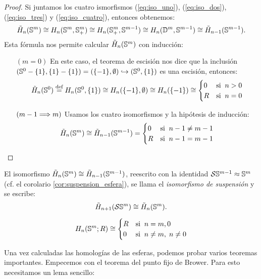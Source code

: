 \documentclass[../../topologia_algebraica]{subfiles}
\begin{document}
\begin{proof}
  Si juntamos los cuatro ismorfismos (\ref{eq:iso_uno}), (\ref{eq:iso_dos}), (\ref{eq:iso_tres})
  y (\ref{eq:iso_cuatro}), entonces obtenemos:
  \[
    \tilde{H}_n(\mathbb{S}^m)\cong
    H_n(\mathbb{S}^m,\mathbb{S}^m_+) \cong
    H_n(\mathbb{S}^m_+,\mathbb{S}^{m-1}) \cong
    H_n(\mathbb{D}^m,\mathbb{S}^{m-1}) \cong
    \tilde{H}_{n-1}(\mathbb{S}^{m-1}).
  \]
  Esta f\'ormula nos permite calcular $\tilde{H}_n(\mathbb{S}^m)$ con inducci\'on:
  \begin{enumerate}
  \item[$(m=0)$] En este caso, el teorema de escisi\'on nos dice que la inclusi\'on
    $(\mathbb{S}^0-\{1\},\{1\}-\{1\})=(\{-1\},\emptyset)\hookrightarrow(\mathbb{S}^0,\{1\})$ es
    una escisi\'on, entonces:
    \[
      \tilde{H}_n(\mathbb{S}^0)\stackrel{\text{def}}{=}
      H_n(\mathbb{S}^0,\{1\}) \cong
      H_n(\{-1\},\emptyset) \cong H_n(\{-1\}) \cong
      \begin{cases}
        0 &\text{si}\;\; n>0 \\
        R &\text{si}\;\; n=0
      \end{cases}
    \]
  \item[$(m-1\Longrightarrow m)$] Usamos los cuatro isomorfismos y la hip\'otesis de inducci\'on:
    \[
      \tilde{H}_n(\mathbb{S}^m)\cong\tilde{H}_{n-1}(\mathbb{S}^{m-1})=
      \begin{cases}
        0 &\text{si}\;\; n-1\neq m-1 \\
        R &\text{si}\;\; n-1=m-1
      \end{cases}
    \]    
  \end{enumerate}
\end{proof}
\begin{nota}
  El isomorfismo $\tilde{H}_n(\mathbb{S}^m)\cong\tilde{H}_{n-1}(\mathbb{S}^{m-1})$, reescrito con la
  identidad $\mathcal{S}\mathbb{S}^{m-1}\approx\mathbb{S}^m$ (cf. el corolario \ref{cor:suspension_esfera}),
  se llama el \emph{isomorfismo de suspensi\'on} y se escribe:
  \[
    \tilde{H}_{n+1}(\mathcal{S}\mathbb{S}^m)\cong\tilde{H}_n(\mathbb{S}^m).
  \]
\end{nota}

\begin{cor}
  \[
    H_n(\mathbb{S}^m;R)\cong
    \begin{cases}
      R &\text{si}\;\; n=m,0 \\
      0 &\text{si}\;\; n\neq m,\;n\neq 0
    \end{cases}
  \]
\end{cor}

Una vez calculadas las homolog\'ias de las esferas, podemos probar varios teoremas
importantes. Empecemos con el teorema del punto fijo de Brower. Para esto necesitamos
un lema sencillo:
\end{document}
